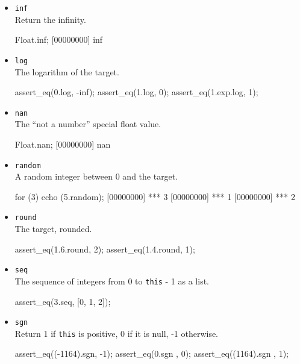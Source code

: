 \begin{itemize}
\item \lstinline|inf|\\
  Return the infinity.
\begin{urbiscript}[firstnumber=last]
Float.inf;
[00000000] inf
\end{urbiscript}

\item \lstinline|log|\\
  The logarithm of the target.
\begin{urbiscript}[firstnumber=last]
assert_eq(0.log, -inf);
assert_eq(1.log, 0);
assert_eq(1.exp.log, 1);
\end{urbiscript}

\item \lstinline|nan|\\
  The ``not a number'' special float value.
\begin{urbiscript}[firstnumber=last]
Float.nan;
[00000000] nan
\end{urbiscript}

\item \lstinline|random|\\
  A random integer between 0 and the target.
\begin{urbiscript}[firstnumber=last]
for (3)
  echo (5.random);
[00000000] *** 3
[00000000] *** 1
[00000000] *** 2
\end{urbiscript}

\item \lstinline|round|\\
  The target, rounded.
\begin{urbiscript}[firstnumber=last]
assert_eq(1.6.round, 2);
assert_eq(1.4.round, 1);
\end{urbiscript}

\item \lstinline|seq|\\
  The sequence of integers from 0 to \lstinline|this| - 1 as a list.
\begin{urbiscript}[firstnumber=last]
assert_eq(3.seq, [0, 1, 2]);
\end{urbiscript}

\item \lstinline|sgn|\\
  Return 1 if \lstinline|this| is positive, 0 if it is null, -1
  otherwise.
\begin{urbiscript}[firstnumber=last]
assert_eq((-1164).sgn, -1);
assert_eq(0.sgn      , 0);
assert_eq((1164).sgn , 1);
\end{urbiscript}


\end{itemize}
